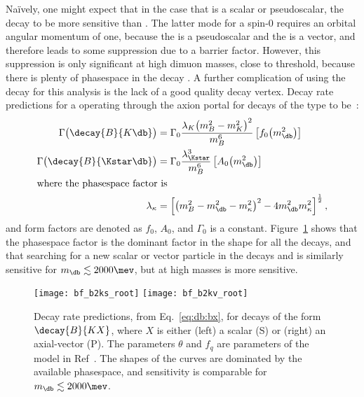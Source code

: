 Na\"{i}vely, one might expect that in the case that \db is a scalar or pseudoscalar, the decay
\decay{\Bd}{\Kp\mumu} to be more sensitive than \btokstrmumu.
The latter mode for a spin-0 \db requires an orbital angular momentum of one, because the \Bd is a
pseudoscalar and the \Kstarz is a vector, and therefore leads to some suppression due to a barrier
factor.
However, this suppression is only significant at high dimuon masses, close to threshold, because
there is plenty of phasespace in the decay \btokstrdb.
A further complication of using the decay \decay{\Bp}{\Kp\mumu} for this analysis is the lack of a
good quality \Bd decay vertex.
Decay rate predictions for a \db operating through the axion portal for decays of the type
 to be~\cite{Batell:2009jf}:
\begin{align}
  \Gamma\big(\decay{B}{K\db}\big) &= \Gamma_0
  \frac{\lambda_{K}\big(m_{B}^2-m_{K}^2\big)^2}{m_{B}^6}
  \left[f_0\!\left(m_\db^2\right)\right]
  \\
  \Gamma\big(\decay{B}{\Kstar\db}\big) &= \Gamma_0
  \frac{\lambda_{\Kstar}^3}{m_{B}^6}
  \left[A_0\!\left(m_\db^2\right)\right]
  \\
  \intertext{where the phasespace factor is}
  \lambda_\kappa &= \left[
    \left( m_B^2 - m_\db^2 - m_\kappa^2 \right)^2
    -4m_\db^2m_\kappa^2
    \right]^\frac12,
    \label{eq:db:bx}
\end{align}
and form factors are denoted as $f_0$, $A_0$, and $\Gamma_0$  is a constant.
Figure~\ref{fig:db:kx} shows that the phasespace factor is the dominant factor in the shape for all
the decays, and that searching for a new scalar or vector particle in the decays
\decay{\Bd}{\Kstarz\db} and \decay{\Bp}{\Kp\db} is similarly sensitive for $m_\db\lesssim2000\mev$,
but at high masses \decay{\Bp}{\Kp\db} is more sensitive.

\begin{figure}
  \begin{center}
    \texttt{[image: bf\_b2ks\_root]}
    \texttt{[image: bf\_b2kv\_root]}
    \caption[Decay rates for decays of the form ]
    {
      Decay rate predictions, from Eq.~\protect\ref{eq:db:bx},
      for decays of the form $\decay{B}{KX}$, where $X$ is either
      (left) a scalar (S) or
      (right) an axial-vector (P).
      The parameters $\theta$ and $f_q$ are parameters of the model in
      Ref~\cite{Batell:2009jf}.
      The shapes of the curves are dominated by the available phasespace, and sensitivity is
      comparable for $m_\db\lesssim2000\mev$.
    }
    \label{fig:db:kx}
  \end{center}
\end{figure}



